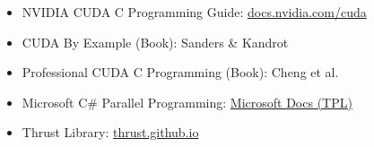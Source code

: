 \begin{itemize}
    \item NVIDIA CUDA C Programming Guide: \href{https://docs.nvidia.com/cuda/}{docs.nvidia.com/cuda}
    \item CUDA By Example (Book): Sanders \& Kandrot
    \item Professional CUDA C Programming (Book): Cheng et al.
    \item Microsoft C\# Parallel Programming: \href{https://docs.microsoft.com/en-us/dotnet/standard/parallel-programming/}{Microsoft Docs (TPL)}
    \item Thrust Library: \href{https://thrust.github.io/}{thrust.github.io}
\end{itemize}
